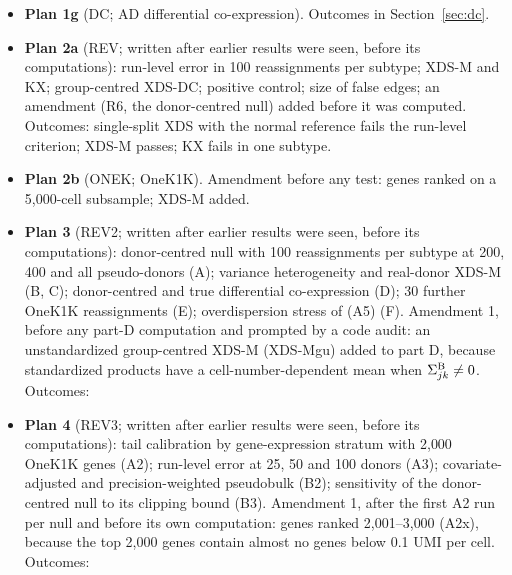 \begin{itemize}
\item \textbf{Plan 1g} (DC; AD differential co-expression). Outcomes in Section~\ref{sec:dc}.
\item \textbf{Plan 2a} (REV; written after earlier results were seen, before its computations): run-level error in 100 reassignments per subtype; XDS-M and KX; group-centred XDS-DC; positive control; size of false edges; an amendment (R6, the donor-centred null) added before it was computed. Outcomes: single-split XDS with the normal reference fails the run-level criterion; XDS-M passes; KX fails in one subtype.
\item \textbf{Plan 2b} (ONEK; OneK1K). Amendment before any test: genes ranked on a 5{,}000-cell subsample; XDS-M added.
\item \textbf{Plan 3} (REV2; written after earlier results were seen, before its computations): donor-centred null with 100 reassignments per subtype at 200, 400 and all pseudo-donors (A); variance heterogeneity and real-donor XDS-M (B, C); donor-centred and true differential co-expression (D); 30 further OneK1K reassignments (E); overdispersion stress of (A5) (F). Amendment 1, before any part-D computation and prompted by a code audit: an unstandardized group-centred XDS-M (XDS-Mgu) added to part D, because standardized products have a cell-number-dependent mean when $\Sigma^{\mathrm{B}}_{jk}\neq0$. Outcomes: \REVtwoOutcomes
\item \textbf{Plan 4} (REV3; written after earlier results were seen, before its computations): tail calibration by gene-expression stratum with 2{,}000 OneK1K genes (A2); run-level error at 25, 50 and 100 donors (A3); covariate-adjusted and precision-weighted pseudobulk (B2); sensitivity of the donor-centred null to its clipping bound (B3). Amendment 1, after the first A2 run per null and before its own computation: genes ranked 2{,}001--3{,}000 (A2x), because the top 2{,}000 genes contain almost no genes below 0.1 UMI per cell. Outcomes: \REVthreeOutcomes

\end{itemize}
